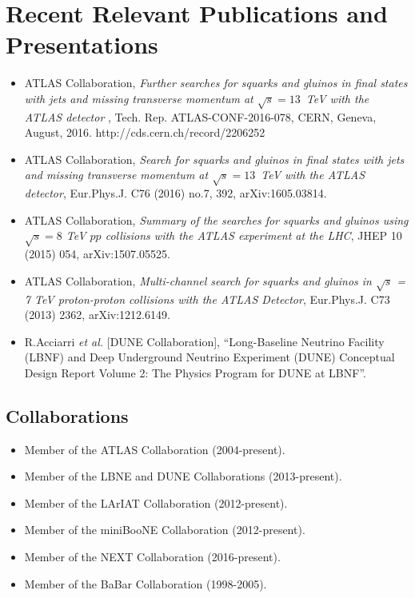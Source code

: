 \documentclass[11pt,]{article}
\begin{document}
\section*{Recent Relevant Publications and Presentations }
\begin{itemize}

\item ATLAS Collaboration, \emph{Further searches for squarks and gluinos in final states with jets and missing transverse momentum at $\sqrt{s}=13$~TeV with the ATLAS detector }, Tech. Rep. ATLAS-CONF-2016-078, CERN, Geneva, August, 2016. http://cds.cern.ch/record/2206252

\item ATLAS Collaboration, \emph{Search for squarks and gluinos in final states with jets and missing transverse momentum at $\sqrt{s}= 13$~TeV with the ATLAS detector}, Eur.Phys.J. C76 (2016) no.7, 392, arXiv:1605.03814.

\item ATLAS Collaboration, \emph{Summary of the searches for squarks and gluinos using $\sqrt{s} = 8$ TeV $pp$ collisions with the ATLAS experiment at the LHC}, JHEP 10 (2015) 054, arXiv:1507.05525.

\item ATLAS Collaboration, \emph{Multi-channel search for squarks and gluinos in $\sqrt{s}$ = 7 TeV proton-proton collisions with the ATLAS Detector}, Eur.Phys.J. C73 (2013) 2362, arXiv:1212.6149.

\item
 R.Acciarri {\it et al.} [DUNE Collaboration], ``Long-Baseline
 Neutrino Facility (LBNF) and Deep Underground Neutrino Experiment
 (DUNE) Conceptual Design Report Volume 2: The Physics Program for
 DUNE at LBNF''. 

\end{itemize}
\subsection*{Collaborations}
\begin{itemize}
\item Member of the ATLAS Collaboration (2004-present). 
\item Member of the LBNE and DUNE Collaborations (2013-present). 
\item Member of the LArIAT Collaboration (2012-present). 
\item Member of the miniBooNE Collaboration (2012-present). 
\item Member of the NEXT Collaboration (2016-present). 
\item Member of the BaBar Collaboration (1998-2005). 
\end{itemize}
\end{document}

